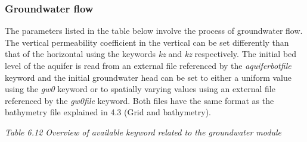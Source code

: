 \documentclass{article}
\begin{document}
\subsubsection{ Groundwater flow}

\noindent The parameters listed in the table below involve the process of groundwater flow. The vertical permeability coefficient in the vertical can be set differently than that of the horizontal using the keywords \textit{kz }and \textit{kz} respectively. The initial bed level of the aquifer is read from an external file referenced by the \textit{aquiferbotfile} keyword and the initial groundwater head can be set to either a uniform value using the \textit{gw0} keyword or to spatially varying values using an external file referenced by the \textit{gw0file }keyword. Both files have the same format as the bathymetry file explained in 4.3 (Grid and bathymetry).

\noindent \textit{Table 6.12 Overview of available keyword related to the groundwater module}
\end{document}
